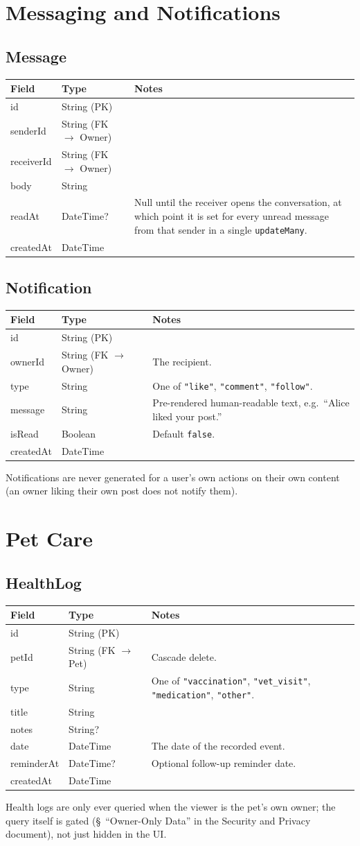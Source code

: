 \documentclass[11pt,a4paper]{article}
\makeatletter
\newcommand{\modeltable}[1]{%
  \begin{tabular}{@{}p{3.3cm}p{2.6cm}p{8.3cm}@{}}
  \toprule
  \textbf{Field} & \textbf{Type} & \textbf{Notes} \\
  \midrule
  #1
  \bottomrule
  \end{tabular}
}
\makeatother
\begin{document}
\section{Messaging and Notifications}

\subsection{Message}
\modeltable{
id & String (PK) & \\
senderId & String (FK $\to$ Owner) & \\
receiverId & String (FK $\to$ Owner) & \\
body & String & \\
readAt & DateTime? & Null until the receiver opens the conversation, at which point it
  is set for every unread message from that sender in a single \texttt{updateMany}. \\
createdAt & DateTime & \\
}

\subsection{Notification}
\modeltable{
id & String (PK) & \\
ownerId & String (FK $\to$ Owner) & The recipient. \\
type & String & One of \texttt{"like"}, \texttt{"comment"}, \texttt{"follow"}. \\
message & String & Pre-rendered human-readable text, e.g.\ ``Alice liked your post.'' \\
isRead & Boolean & Default \texttt{false}. \\
createdAt & DateTime & \\
}
Notifications are never generated for a user's own actions on their own content (an
owner liking their own post does not notify them).

\section{Pet Care}

\subsection{HealthLog}
\modeltable{
id & String (PK) & \\
petId & String (FK $\to$ Pet) & Cascade delete. \\
type & String & One of \texttt{"vaccination"}, \texttt{"vet\_visit"},
  \texttt{"medication"}, \texttt{"other"}. \\
title & String & \\
notes & String? & \\
date & DateTime & The date of the recorded event. \\
reminderAt & DateTime? & Optional follow-up reminder date. \\
createdAt & DateTime & \\
}
Health logs are only ever queried when the viewer is the pet's own owner; the query
itself is gated (\S~``Owner-Only Data'' in the Security and Privacy document), not just
hidden in the UI.
\end{document}
